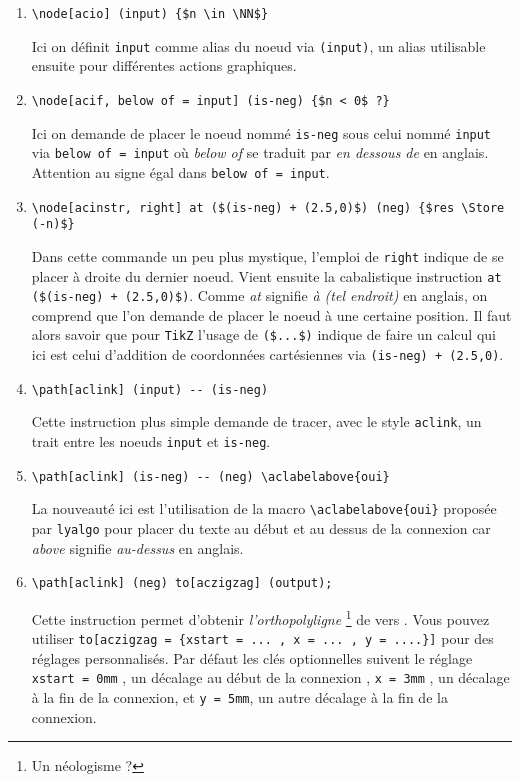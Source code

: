 \documentclass[12pt,a4paper]{article}
\theoremstyle{definition}
\newcommand\myquote[1]{{\itshape \og #1 \fg}}
\begin{document}
\begin{enumerate}
	\item \verb+\node[acio] (input) {$n \in \NN$}+
	      
	      \smallskip
	      Ici on définit \verb+input+ comme alias du noeud via \verb+(input)+, un alias utilisable ensuite pour différentes actions graphiques. 

	\medskip
	\item \verb+\node[acif, below of = input] (is-neg) {$n < 0$ ?}+

	      \smallskip
	      Ici on demande de placer le noeud nommé \verb+is-neg+ sous celui nommé \verb+input+ via \verb+below of = input+ où \myquote{below of} se traduit par \myquote{en dessous de} en anglais. Attention au signe égal dans \verb+below of = input+.
	
	\medskip
	\item \verb|\node[acinstr, right] at ($(is-neg) + (2.5,0)$) (neg) {$res \Store (-n)$}|
	      
	      \smallskip
	      Dans cette commande un peu plus mystique, l'emploi de \verb+right+ indique de se placer à droite du dernier noeud.
	      Vient ensuite la cabalistique instruction \verb|at ($(is-neg) + (2.5,0)$)|.
	      Comme \myquote{at} signifie \myquote{à (tel endroit)} en anglais, on comprend que l'on demande de placer le noeud à une certaine position.
	       Il faut alors savoir que pour \verb+TikZ+ l'usage de \verb|($...$)| indique de faire un calcul qui ici est celui d'addition de coordonnées cartésiennes via \verb|(is-neg) + (2.5,0)|. 
	
	\medskip
	\item \verb+\path[aclink] (input) -- (is-neg)+
	      
	      \smallskip
	      Cette instruction plus simple demande de tracer, avec le style \verb+aclink+, un trait entre les noeuds \verb+input+ et \verb+is-neg+.
	
	\medskip
	\item \verb+\path[aclink] (is-neg) -- (neg) \aclabelabove{oui}+
	      
	      \smallskip
	      La nouveauté ici est l'utilisation de la macro \verb+\aclabelabove{oui}+ proposée par \verb+lyalgo+ pour placer du texte au début et au dessus de la connexion car \myquote{above} signifie \myquote{au-dessus} en anglais. 

	\medskip
	\item \verb+\path[aclink] (neg) to[aczigzag] (output);+
	      
	      \smallskip
	      Cette instruction permet d'obtenir \myquote{l'orthopolyligne} 
	      \footnote{
	          Un néologisme ?
	      }
	      de  vers  .
	      Vous pouvez utiliser \verb+to[aczigzag = {xstart = ... , x = ... , y = ....}]+  pour des réglages personnalisés.
	      Par défaut les clés optionnelles suivent le réglage \verb+xstart = 0mm+ , un décalage au début de la connexion , \verb+x = 3mm+ , un décalage à la fin de la connexion, et \verb+y = 5mm+, un autre décalage à la fin de la connexion.
\end{enumerate}
\end{document}

